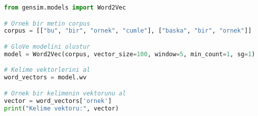\begin{lstlisting}[language=Python]
from gensim.models import Word2Vec

# Ornek bir metin corpus
corpus = [["bu", "bir", "ornek", "cumle"], ["baska", "bir", "ornek"]]

# GloVe modelini olustur
model = Word2Vec(corpus, vector_size=100, window=5, min_count=1, sg=1)

# Kelime vektorlerini al
word_vectors = model.wv

# Ornek bir kelimenin vektorunu al
vector = word_vectors['ornek']
print("Kelime vektoru:", vector)
\end{lstlisting}

\newpage